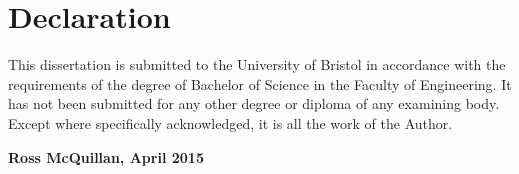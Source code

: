 \chapter*{Declaration}
This dissertation is submitted to the University of Bristol in accordance with the requirements of the degree of Bachelor of Science in the Faculty of Engineering. It has not been submitted for any other degree or diploma of any examining body. Except where specifically acknowledged, it is all the work of the Author.

\bigskip
\bigskip
\bigskip
\noindent
\large{\textbf{Ross McQuillan, April 2015}}
